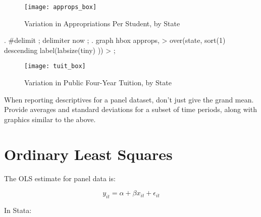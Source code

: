\documentclass[12pt]{article}
\begin{document}
\begin{figure}[h]
  \centering
  \texttt{[image: approps\_box]}
  \caption{Variation in Appropriations Per Student, by State}
\end{figure}


\begin{stlog}
  . #delimit ;
delimiter now ;
. graph hbox approps,
> over(state, sort(1) descending label(labsize(tiny) )) 
> ;
\end{stlog}


\begin{figure}[h]
  \centering
  \texttt{[image: tuit\_box]}
  \caption{Variation in Public Four-Year Tuition, by State}
\end{figure}


When reporting descriptives for a panel dataset, don't just give the
grand mean. Provide averages and standard deviations for a subset of
time periods, along with graphics similar to the above. 

\section{Ordinary Least Squares}

The OLS estimate for panel data is: 

\begin{equation*}
  \label{eq:ols}
  y_{it}=\alpha+ \beta x_{it} + \epsilon_{it}
\end{equation*}


In Stata:
\end{document}
